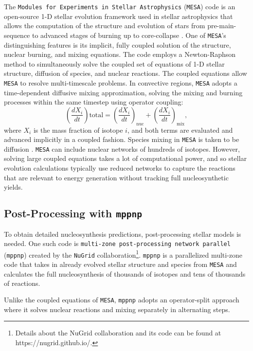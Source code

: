 The \texttt{Modules for Experiments in Stellar Astrophysics} (\texttt{MESA}) code is an open-source 1-D stellar evolution framework used in stellar astrophysics that allows the computation of the structure and evolution of stars from pre-main-sequence to advanced stages of burning up to core-collapse \citep{paxtonMODULESEXPERIMENTSLAR2010}.
One of \texttt{MESA}’s distinguishing features is its implicit, fully coupled solution of the structure, nuclear burning, and mixing equations. 
The code employs a Newton-Raphson method to simultaneously solve the coupled set of equations of 1-D stellar structure, diffusion of species, and nuclear reactions.
The coupled equations allow \texttt{MESA} to resolve multi-timescale problems.
In convective regions, \texttt{MESA} adopts a time-dependent diffusive mixing approximation, solving the mixing and burning processes within the same timestep using operator coupling:
\begin{equation}
\left( \frac{dX_i}{dt} \right)\text{total} = \left( \frac{dX_i}{dt} \right)_\text{nuc} + \left( \frac{dX_i}{dt} \right)_\text{mix},
\end{equation}
where $X_i$ is the mass fraction of isotope $i$, and both terms are evaluated and advanced implicitly in a coupled fashion. 
Species mixing in \texttt{MESA} is taken to be diffusion \cite{paxtonMODULESEXPERIMENTSLAR2010}.
\texttt{MESA} can include nuclear networks of hundreds of isotopes.
However, solving large coupled equations takes a lot of computational power, and so stellar evolution calculations typically use reduced networks to capture the reactions that are relevant to energy generation without tracking full nucleosynthetic yields.

\subsection{Post-Processing with \texttt{mppnp}}

To obtain detailed nucleosynthesis predictions, post-processing stellar models is needed.
One such code is \texttt{multi-zone post-processing network parallel} (\texttt{mppnp}) created by the \texttt{NuGrid} collaboration\footnote{Details about the NuGrid collaboration and its code can be found at https://nugrid.github.io/.}.
\texttt{mppnp} is a parallelized multi-zone code that takes in already evolved stellar structure and species from \texttt{MESA} and calculates the full nucleosynthesis of thousands of isotopes and tens of thousands of reactions.

Unlike the coupled equations of \texttt{MESA}, \texttt{mppnp} adopts an operator-split approach where it solves nuclear reactions and mixing separately in alternating steps.

